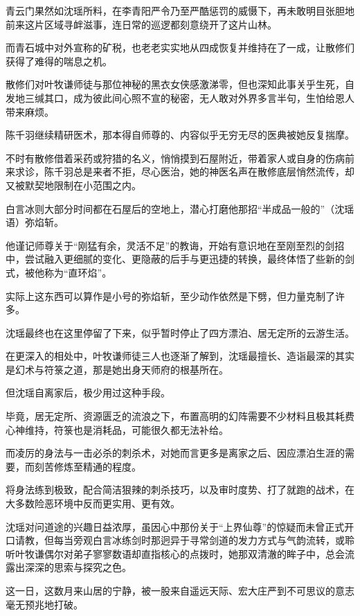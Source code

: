 青云门果然如沈瑶所料，在李青阳严令乃至严酷惩罚的威慑下，再未敢明目张胆地前来这片区域寻衅滋事，连日常的巡逻都刻意绕开了这片山林。

而青石城中对外宣称的矿税，也老老实实地从四成恢复并维持在了一成，让散修们获得了难得的喘息之机。

散修们对叶牧谦师徒与那位神秘的黑衣女侠感激涕零，但也深知此事关乎生死，自发地三缄其口，成为彼此间心照不宣的秘密，无人敢对外界多言半句，生怕给恩人带来麻烦。

陈千羽继续精研医术，那本得自师尊的、内容似乎无穷无尽的医典被她反复揣摩。

不时有散修借着采药或狩猎的名义，悄悄摸到石屋附近，带着家人或自身的伤病前来求诊，陈千羽总是来者不拒，尽心医治，她的神医名声在散修底层悄然流传，却又被默契地限制在小范围之内。

白言冰则大部分时间都在石屋后的空地上，潜心打磨他那招“半成品一般的”（沈瑶语）弥焰斩。

他谨记师尊关于“刚猛有余，灵活不足”的教诲，开始有意识地在至刚至烈的剑招中，尝试融入更细腻的变化、更隐蔽的后手与更迅捷的转换，最终体悟了些新的剑式，被他称为“直环焰”。

实际上这东西可以算作是小号的弥焰斩，至少动作依然是下劈，但力量克制了许多。

\vspace{2em}

沈瑶最终也在这里停留了下来，似乎暂时停止了四方漂泊、居无定所的云游生活。

在更深入的相处中，叶牧谦师徒三人也逐渐了解到，沈瑶最擅长、造诣最深的其实是幻术与符箓之道，那是她出身天师府的根基所在。

但沈瑶自离家后，极少用过这种手段。

毕竟，居无定所、资源匮乏的流浪之下，布置高明的幻阵需要不少材料且极其耗费心神维持，符箓也是消耗品，可能很久都无法补给。

而凌厉的身法与一击必杀的刺杀术，对她而言更多是离家之后、因应漂泊生涯的需要，而刻苦修炼至精通的程度。

将身法练到极致，配合简洁狠辣的刺杀技巧，以及审时度势、打了就跑的战术，在大多数险恶环境中反而更实用、更有效。

沈瑶对问道途的兴趣日益浓厚，虽因心中那份关于“上界仙尊”的惊疑而未曾正式开口请教，但每当旁观白言冰练剑时那迥异于寻常剑道的发力方式与气韵流转，或聆听叶牧谦偶尔对弟子寥寥数语却直指核心的点拨时，她那双清澈的眸子中，总会流露出深深的思索与探究之色。

\vspace{2em}

这一日，这数月来山居的宁静，被一股来自遥远天际、宏大庄严到不可思议的意志毫无预兆地打破。

